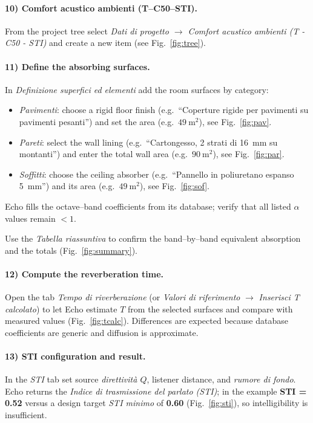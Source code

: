 \paragraph{10) Comfort acustico ambienti (T–C50–STI).}
From the project tree select \emph{Dati di progetto $\rightarrow$ Comfort acustico ambienti (T - C50 - STI)} and create a new item (see Fig.~\ref{fig:tree}).

\paragraph{11) Define the absorbing surfaces.}
In \emph{Definizione superfici ed elementi} add the room surfaces by category:
\begin{itemize}
  \item \emph{Pavimenti}: choose a rigid floor finish (e.g.\ ``Coperture rigide per pavimenti su pavimenti pesanti'') and set the area (e.g.\ $49~\mathrm{m^2}$), see Fig.~\ref{fig:pav}.
  \item \emph{Pareti}: select the wall lining (e.g.\ ``Cartongesso, 2 strati di 16~mm su montanti'') and enter the total wall area (e.g.\ $90~\mathrm{m^2}$), see Fig.~\ref{fig:par}.
  \item \emph{Soffitti}: choose the ceiling absorber (e.g.\ ``Pannello in poliuretano espanso 5~mm'') and its area (e.g.\ $49~\mathrm{m^2}$), see Fig.~\ref{fig:sof}.
\end{itemize}
Echo fills the octave–band coefficients from its database; verify that all listed $\alpha$ values remain $<1$.

Use the \emph{Tabella riassuntiva} to confirm the band–by–band equivalent absorption and the totals (Fig.~\ref{fig:summary}).

\paragraph{12) Compute the reverberation time.}
Open the tab \emph{Tempo di riverberazione} (or \emph{Valori di riferimento} $\rightarrow$ \emph{Inserisci T calcolato}) to let Echo estimate $T$ from the selected surfaces and compare with measured values (Fig.~\ref{fig:tcalc}). Differences are expected because database coefficients are generic and diffusion is approximate.

\paragraph{13) STI configuration and result.}
In the \emph{STI} tab set source \emph{direttività $Q$}, listener distance, and \emph{rumore di fondo}. Echo returns the \emph{Indice di trasmissione del parlato (STI)}; in the example \textbf{STI = 0.52} versus a design target \emph{STI minimo} of \textbf{0.60} (Fig.~\ref{fig:sti}), so intelligibility is insufficient.


